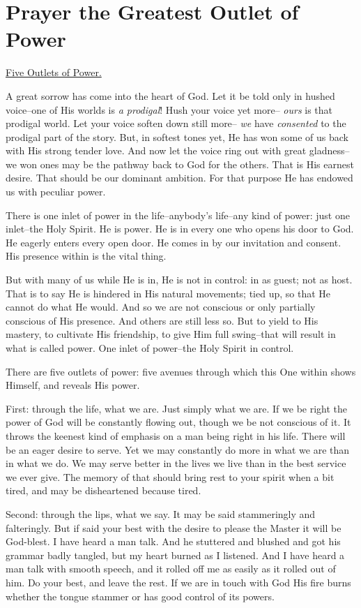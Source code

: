 \chapter{Prayer the Greatest Outlet of Power}

\underline{Five Outlets of Power.}

A great sorrow has come into the heart of God. Let it be told only in
hushed voice--one of His worlds is \textit{a prodigal}! Hush your voice yet
more-- \textit{ours} is that prodigal world. Let your voice soften down still
more-- \textit{we} have \textit{consented} to the prodigal part of the story. But, in
softest tones yet, He has won some of us back with His strong tender love.
And now let the voice ring out with great gladness--we won ones may be the
pathway back to God for the others. That is His earnest desire. That
should be our dominant ambition. For that purpose He has endowed us with
peculiar power.

There is one inlet of power in the life--anybody's life--any kind of
power: just one inlet--the Holy Spirit. He is power. He is in every one
who opens his door to God. He eagerly enters every open door. He comes in
by our invitation and consent. His presence within is the vital thing.

But with many of us while He is in, He is not in control: in as guest; not
as host. That is to say He is hindered in His natural movements; tied up,
so that He cannot do what He would. And so we are not conscious or only
partially conscious of His presence. And others are still less so. But to
yield to His mastery, to cultivate His friendship, to give Him full
swing--that will result in what is called power. One inlet of power--the
Holy Spirit in control.

There are five outlets of power: five avenues through which this One
within shows Himself, and reveals His power.

First: through the life, what we are. Just simply what we are. If we be
right the power of God will be constantly flowing out, though we be not
conscious of it. It throws the keenest kind of emphasis on a man being
right in his life. There will be an eager desire to serve. Yet we may
constantly do more in what we are than in what we do. We may serve better
in the lives we live than in the best service we ever give. The memory of
that should bring rest to your spirit when a bit tired, and may be
disheartened because tired.

Second: through the lips, what we say. It may be said stammeringly and
falteringly. But if said your best with the desire to please the Master it
will be God-blest. I have heard a man talk. And he stuttered and blushed
and got his grammar badly tangled, but my heart burned as I listened. And
I have heard a man talk with smooth speech, and it rolled off me as easily
as it rolled out of him. Do your best, and leave the rest. If we are in
touch with God His fire burns whether the tongue stammer or has good
control of its powers.

